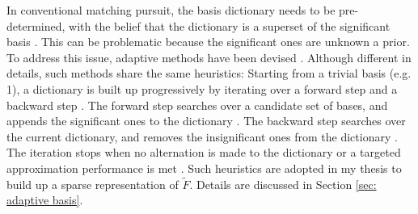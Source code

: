 In conventional matching pursuit, the basis dictionary needs to
be pre-determined, with the belief that the dictionary is a superset of the significant basis
\cite{adaptive basis 2}. 
This can be problematic because the significant ones are unknown a prior.
To address this issue, adaptive methods have been devised 
\cite{adaptive basis 1, adaptive basis 2, adaptive basis 3}.
Although different in details, such methods share the same heuristics: Starting from a trivial
basis (e.g. 1), a dictionary is built up progressively 
by iterating over a forward step and a backward step
\cite{adaptive basis 1, adaptive basis 2, adaptive basis 3}.
The forward step searches over a candidate set of bases, and appends the significant ones 
to the dictionary
\cite{adaptive basis 1, adaptive basis 2, adaptive basis 3}.
The backward step searches over the current dictionary, and removes the 
insignificant ones from the dictionary
\cite{adaptive basis 1, adaptive basis 2, adaptive basis 3}.
The iteration stops when no alternation is made to the dictionary or a targeted approximation
performance is met 
\cite{adaptive basis 1, adaptive basis 2, adaptive basis 3}.
Such heuristics are adopted in my thesis to build up 
a sparse representation of $\tilde{F}$. Details are discussed in Section \ref{sec: adaptive basis}.\\


